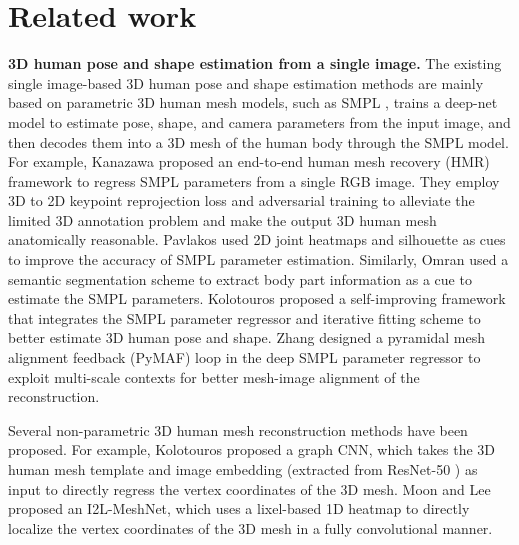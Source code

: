 \documentclass[10pt,twocolumn,letterpaper]{article}
\begin{document}
\section{Related work}\vspace{-5pt}
\label{sec:formatting}

\iffalse
This section overviews concisely about recent efforts relevant to the tasks of 3D human pose and shape estimation and attention mechanism.

\subsection{3D human pose and shape estimation from a single image}
\fi

{\bf 3D human pose and shape estimation from a single image.} The existing single image-based 3D human pose and shape estimation methods are mainly based on parametric 3D human mesh models, such as SMPL \cite{Loper2015SMPLAS}, \ie trains a deep-net model to estimate pose, shape, and camera parameters from the input image, and then decodes them into a 3D mesh of the human body through the SMPL model. For example, Kanazawa \etal \cite{hmrKanazawa17} proposed an end-to-end human mesh recovery (HMR) framework to regress SMPL parameters from a single RGB image. They employ 3D to 2D keypoint reprojection loss and adversarial training to alleviate the limited 3D annotation problem and make the output 3D human mesh anatomically reasonable. Pavlakos \etal \cite{Pavlakos2018LearningTE} used 2D joint heatmaps and silhouette as cues to improve the accuracy of SMPL parameter estimation. Similarly, Omran \etal \cite{omran2018nbf} used a semantic segmentation scheme to extract body part information as a cue to estimate the SMPL parameters. Kolotouros \etal \cite{Kolotouros2019LearningTR} proposed a self-improving framework that integrates the SMPL parameter regressor and iterative fitting scheme to better estimate 3D human pose and shape. Zhang \etal \cite{pymaf2021} designed a pyramidal mesh alignment feedback (PyMAF) loop in the deep SMPL parameter regressor to exploit multi-scale contexts for better mesh-image alignment of the reconstruction.\vspace{-2pt} 

Several non-parametric 3D human mesh reconstruction methods \cite{Kolotouros2019ConvolutionalMR,varol18_bodynet,Moon_2020_ECCV_I2L-MeshNet} have been proposed. For example, Kolotouros \etal \cite{Kolotouros2019ConvolutionalMR} proposed a graph CNN, which takes the 3D human mesh template and image embedding (extracted from ResNet-50 \cite{He2016DeepRL}) as input to directly regress the vertex coordinates of the 3D mesh. Moon and Lee \cite{Moon_2020_ECCV_I2L-MeshNet} proposed an I2L-MeshNet, which uses a lixel-based 1D heatmap to directly localize the vertex coordinates of the 3D mesh in a fully convolutional manner.\vspace{-2pt}
\end{document}
